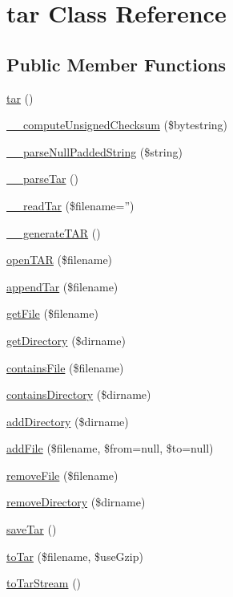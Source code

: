 \hypertarget{classtar}{\section{tar Class Reference}
\label{classtar}
}
\subsection*{Public Member Functions}
\begin{DoxyCompactItemize}
\item 
\hyperlink{classtar_a310c3cc3417ea0fdb5c1c96cc5b47efa}{tar} ()
\item 
\hyperlink{classtar_a2f9a99c49a3ab86475a1cd26e722c0fa}{\+\_\+\+\_\+compute\+Unsigned\+Checksum} (\$bytestring)
\item 
\hyperlink{classtar_ab9d60205cd0862d6d3cfb582b43a3288}{\+\_\+\+\_\+parse\+Null\+Padded\+String} (\$string)
\item 
\hyperlink{classtar_a8d8793668fa7e2de0beb4dca399ee3ed}{\+\_\+\+\_\+parse\+Tar} ()
\item 
\hyperlink{classtar_a1422972f8f5afac82f82ecab505b4079}{\+\_\+\+\_\+read\+Tar} (\$filename='')
\item 
\hyperlink{classtar_a97fd04b02c85bbb3eb588a160237f375}{\+\_\+\+\_\+generate\+T\+A\+R} ()
\item 
\hyperlink{classtar_a62fc429d1e33de90d1ce65c3c16a4193}{open\+T\+A\+R} (\$filename)
\item 
\hyperlink{classtar_a3c35ee6b05a860a0108afa5853db4070}{append\+Tar} (\$filename)
\item 
\hyperlink{classtar_a8eb93e97f657daf1a3671c60f7093745}{get\+File} (\$filename)
\item 
\hyperlink{classtar_a02157ed6604bec5f931ad08d1c5c048f}{get\+Directory} (\$dirname)
\item 
\hyperlink{classtar_ac7ba975f7bcf57d9a8167feb7122933e}{contains\+File} (\$filename)
\item 
\hyperlink{classtar_aff90f763b61b935c856eb7e634a2c0a7}{contains\+Directory} (\$dirname)
\item 
\hyperlink{classtar_a046188f5c3141d52246774c13ab2c895}{add\+Directory} (\$dirname)
\item 
\hyperlink{classtar_a374a307255a5fc5110749b1e37946947}{add\+File} (\$filename, \$from=null, \$to=null)
\item 
\hyperlink{classtar_a51cd4b11f9e4e6c9c5c0bc93d5a063c7}{remove\+File} (\$filename)
\item 
\hyperlink{classtar_a17971edb42a8be66b554ca5d6cf6bc1e}{remove\+Directory} (\$dirname)
\item 
\hyperlink{classtar_ac70edc9fc85a3106aaa3c07a3a57a0a2}{save\+Tar} ()
\item 
\hyperlink{classtar_acfe90e92d12e463da735e3c42e5a74f1}{to\+Tar} (\$filename, \$use\+Gzip)
\item 
\hyperlink{classtar_a347041e79cbe8f150933afe77f35826f}{to\+Tar\+Stream} ()
\end{DoxyCompactItemize}
